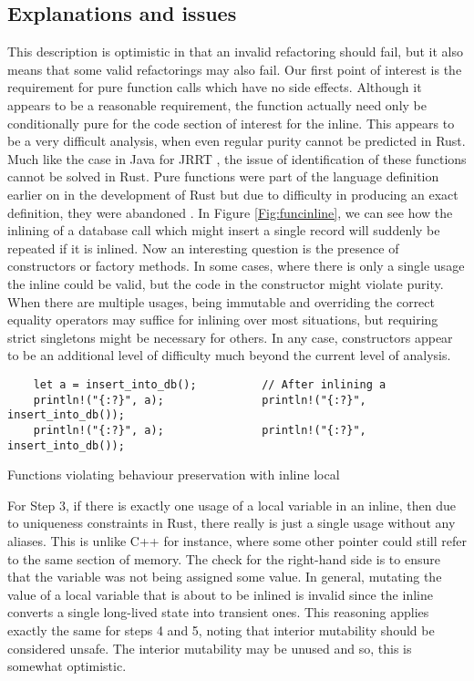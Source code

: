 \subsection{Explanations and issues}\label{S:inlineissues}
This description is optimistic in that an invalid refactoring should fail, but it also means that some valid refactorings may also fail. Our first point of interest is the requirement for pure function calls which have no side effects. Although it appears to be a reasonable requirement, the function actually need only be conditionally pure for the code section of interest for the inline. This appears to be a very difficult analysis, when even regular purity cannot be predicted in Rust. Much like the case in Java for JRRT \cite{schafer2010specification}, the issue of identification of these functions cannot be solved in Rust. Pure functions were part of the language definition earlier on in the development of Rust but due to difficulty in producing an exact definition, they were abandoned \cite{pwalton}. In Figure \ref{Fig:funcinline}, we can see how the inlining of a database call which might insert a single record will suddenly be repeated if it is inlined. Now an interesting question is the presence of constructors or factory methods. In some cases, where there is only a single usage the inline could be valid, but the code in the constructor might violate purity. When there are multiple usages, being immutable and overriding the correct equality operators may suffice for inlining over most situations, but requiring strict singletons might be necessary for others. In any case, constructors appear to be an additional level of difficulty much beyond the current level of analysis.

\begin{fig}[H]
\begin{verbatim}
    let a = insert_into_db();          // After inlining a
    println!("{:?}", a);               println!("{:?}", insert_into_db());
    println!("{:?}", a);               println!("{:?}", insert_into_db());
\end{verbatim}
\caption{Functions violating behaviour preservation with inline local}
\label{Fig:funcinline}
\end{fig}

For Step 3, if there is exactly one usage of a local variable in an inline, then due to uniqueness constraints in Rust, there really is just a single usage without any aliases. This is unlike C++ for instance, where some other pointer could still refer to the same section of memory. The check for the right-hand side is to ensure that the variable was not being assigned some value. In general, mutating the value of a local variable that is about to be inlined is invalid since the inline converts a single long-lived state into transient ones. This reasoning applies exactly the same for steps 4 and 5, noting that interior mutability should be considered unsafe. The interior mutability may be unused and so, this is somewhat optimistic.

